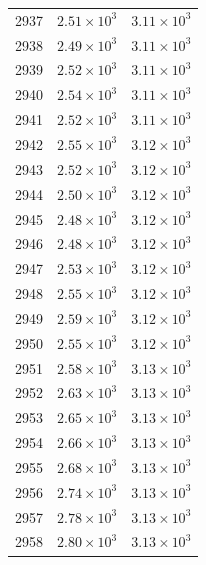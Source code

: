 \begin{table}[H]
\begin{tabular}{lll}
2937 & $\displaystyle 2.51 \times 10^{3}$ & $\displaystyle 3.11 \times 10^{3}$ \\
2938 & $\displaystyle 2.49 \times 10^{3}$ & $\displaystyle 3.11 \times 10^{3}$ \\
2939 & $\displaystyle 2.52 \times 10^{3}$ & $\displaystyle 3.11 \times 10^{3}$ \\
2940 & $\displaystyle 2.54 \times 10^{3}$ & $\displaystyle 3.11 \times 10^{3}$ \\
2941 & $\displaystyle 2.52 \times 10^{3}$ & $\displaystyle 3.11 \times 10^{3}$ \\
2942 & $\displaystyle 2.55 \times 10^{3}$ & $\displaystyle 3.12 \times 10^{3}$ \\
2943 & $\displaystyle 2.52 \times 10^{3}$ & $\displaystyle 3.12 \times 10^{3}$ \\
2944 & $\displaystyle 2.50 \times 10^{3}$ & $\displaystyle 3.12 \times 10^{3}$ \\
2945 & $\displaystyle 2.48 \times 10^{3}$ & $\displaystyle 3.12 \times 10^{3}$ \\
2946 & $\displaystyle 2.48 \times 10^{3}$ & $\displaystyle 3.12 \times 10^{3}$ \\
2947 & $\displaystyle 2.53 \times 10^{3}$ & $\displaystyle 3.12 \times 10^{3}$ \\
2948 & $\displaystyle 2.55 \times 10^{3}$ & $\displaystyle 3.12 \times 10^{3}$ \\
2949 & $\displaystyle 2.59 \times 10^{3}$ & $\displaystyle 3.12 \times 10^{3}$ \\
2950 & $\displaystyle 2.55 \times 10^{3}$ & $\displaystyle 3.12 \times 10^{3}$ \\
2951 & $\displaystyle 2.58 \times 10^{3}$ & $\displaystyle 3.13 \times 10^{3}$ \\
2952 & $\displaystyle 2.63 \times 10^{3}$ & $\displaystyle 3.13 \times 10^{3}$ \\
2953 & $\displaystyle 2.65 \times 10^{3}$ & $\displaystyle 3.13 \times 10^{3}$ \\
2954 & $\displaystyle 2.66 \times 10^{3}$ & $\displaystyle 3.13 \times 10^{3}$ \\
2955 & $\displaystyle 2.68 \times 10^{3}$ & $\displaystyle 3.13 \times 10^{3}$ \\
2956 & $\displaystyle 2.74 \times 10^{3}$ & $\displaystyle 3.13 \times 10^{3}$ \\
2957 & $\displaystyle 2.78 \times 10^{3}$ & $\displaystyle 3.13 \times 10^{3}$ \\
2958 & $\displaystyle 2.80 \times 10^{3}$ & $\displaystyle 3.13 \times 10^{3}$ \\

\end{tabular}
\end{table}
